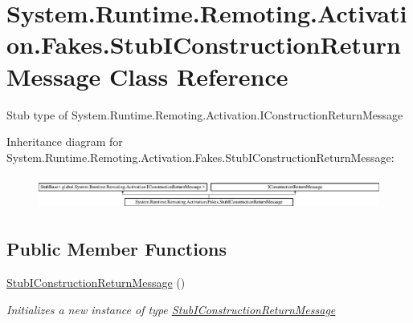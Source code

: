 \hypertarget{class_system_1_1_runtime_1_1_remoting_1_1_activation_1_1_fakes_1_1_stub_i_construction_return_message}{\section{System.\-Runtime.\-Remoting.\-Activation.\-Fakes.\-Stub\-I\-Construction\-Return\-Message Class Reference}
\label{class_system_1_1_runtime_1_1_remoting_1_1_activation_1_1_fakes_1_1_stub_i_construction_return_message}
}


Stub type of System.\-Runtime.\-Remoting.\-Activation.\-I\-Construction\-Return\-Message 


Inheritance diagram for System.\-Runtime.\-Remoting.\-Activation.\-Fakes.\-Stub\-I\-Construction\-Return\-Message\-:\begin{figure}[H]
\begin{center}
\leavevmode
\includegraphics[height=1.111111cm]{class_system_1_1_runtime_1_1_remoting_1_1_activation_1_1_fakes_1_1_stub_i_construction_return_message}
\end{center}
\end{figure}
\subsection*{Public Member Functions}
\begin{DoxyCompactItemize}
\item 
\hyperlink{class_system_1_1_runtime_1_1_remoting_1_1_activation_1_1_fakes_1_1_stub_i_construction_return_message_a540dfe0b1e1e5f041aab62bcede6d953}{Stub\-I\-Construction\-Return\-Message} ()
\begin{DoxyCompactList}\small\item\em Initializes a new instance of type \hyperlink{class_system_1_1_runtime_1_1_remoting_1_1_activation_1_1_fakes_1_1_stub_i_construction_return_message}{Stub\-I\-Construction\-Return\-Message}\end{DoxyCompactList}\end{DoxyCompactItemize}
